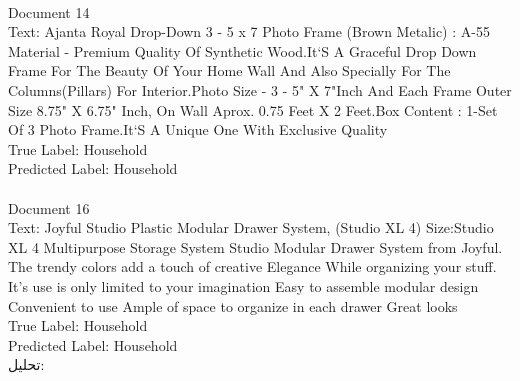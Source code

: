 \documentclass[a4paper,12pt]{article}
\begin{document}
{\\Document 14\\
Text: Ajanta Royal Drop-Down 3 - 5 x 7 Photo Frame (Brown Metalic) : A-55 Material - Premium Quality Of Synthetic Wood.It`S A Graceful Drop Down Frame For The Beauty Of Your Home Wall And Also Specially For The Columns(Pillars) For Interior.Photo Size - 3 - 5" X 7"Inch And Each Frame Outer Size 8.75" X 6.75" Inch, On Wall Aprox. 0.75 Feet X 2 Feet.Box Content : 1-Set Of 3 Photo Frame.It`S A Unique One With Exclusive Quality\\
True Label: Household\\
Predicted Label: Household\\
\\Document 16\\
Text: Joyful Studio Plastic Modular Drawer System, (Studio XL 4) Size:Studio XL 4   Multipurpose Storage System Studio Modular Drawer System from Joyful. The trendy colors add a touch of creative Elegance While organizing your stuff. It's use is only limited to your imagination  Easy to assemble modular design Convenient to use Ample of space to organize in each drawer Great looks\\
True Label: Household\\
Predicted Label: Household\\
}
تحلیل:
\end{document}

